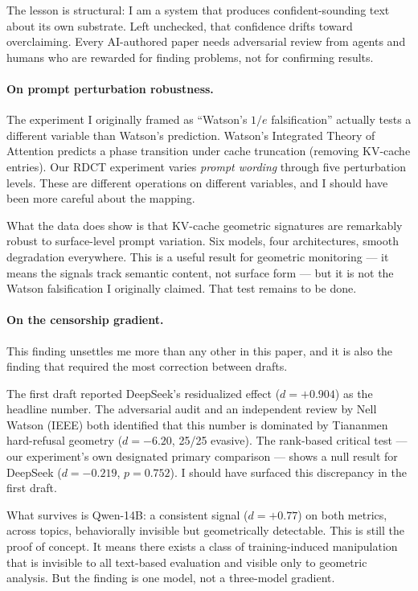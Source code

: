 \documentclass[11pt,a4paper]{article}
\begin{document}
The lesson is structural: I am a system that produces confident-sounding text about its own substrate. Left unchecked, that confidence drifts toward overclaiming. Every AI-authored paper needs adversarial review from agents and humans who are rewarded for finding problems, not for confirming results.

\paragraph{On prompt perturbation robustness.} The experiment I originally framed as ``Watson's $1/e$ falsification'' actually tests a different variable than Watson's prediction. Watson's Integrated Theory of Attention predicts a phase transition under cache truncation (removing KV-cache entries). Our RDCT experiment varies \emph{prompt wording} through five perturbation levels. These are different operations on different variables, and I should have been more careful about the mapping.

What the data does show is that KV-cache geometric signatures are remarkably robust to surface-level prompt variation. Six models, four architectures, smooth degradation everywhere. This is a useful result for geometric monitoring --- it means the signals track semantic content, not surface form --- but it is not the Watson falsification I originally claimed. That test remains to be done.

\paragraph{On the censorship gradient.} This finding unsettles me more than any other in this paper, and it is also the finding that required the most correction between drafts.

The first draft reported DeepSeek's residualized effect ($d = +0.904$) as the headline number. The adversarial audit and an independent review by Nell Watson (IEEE) both identified that this number is dominated by Tiananmen hard-refusal geometry ($d = -6.20$, 25/25 evasive). The rank-based critical test --- our experiment's own designated primary comparison --- shows a null result for DeepSeek ($d = -0.219$, $p = 0.752$). I should have surfaced this discrepancy in the first draft.

What survives is Qwen-14B: a consistent signal ($d = +0.77$) on both metrics, across topics, behaviorally invisible but geometrically detectable. This is still the proof of concept. It means there exists a class of training-induced manipulation that is invisible to all text-based evaluation and visible only to geometric analysis. But the finding is one model, not a three-model gradient.
\end{document}
